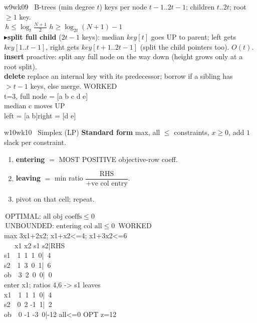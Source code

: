 \documentclass[9pt]{extarticle}
\newcommand{\key}[1]{\colorbox{hl}{\ensuremath{\,#1\,}}}     %
\newcommand{\R}{\textcolor{red!75!black}{$\blacktriangleright$}\;}  %
\newcommand{\ex}{\textcolor{black!55}{\scriptsize\textsf{WORKED}}\\[1pt]} %
\begin{document}
\begin{multicols}{3}
\begin{wk}{w9}{wk09 \ B-trees (min degree $t$)}
keys per node $t{-}1..2t{-}1$; children $t..2t$; root $\ge1$ key.\\[1pt]
\key{h\le\log_t\tfrac{N+1}{2}}\quad\key{h\ge\log_{2t}(N{+}1)-1}\\[2pt]
\R \textbf{split full child} ($2t{-}1$ keys): median $key[t]$ goes UP to parent; left gets $key[1..t{-}1]$, right gets $key[t{+}1..2t{-}1]$ (split the child pointers too). $O(t)$.\\[1pt]
\textbf{insert} proactive: split any full node on the way down (height grows only at a root split).\\
\textbf{delete} replace an internal key with its predecessor; borrow if a sibling has ${>}t{-}1$ keys, else merge.
\tcblower
\ex
\ttfamily
t=3, full node = [a b c d e]\\
median c moves UP\\
left = [a b]\quad right = [d e]
\end{wk}

\begin{wk}{w10}{wk10 \ Simplex (LP)}
\textbf{Standard form} max, all ${\le}$ constraints, $x\ge0$, add $1$ slack per constraint.
\begin{enumerate}
\item \textbf{entering} $=$ MOST POSITIVE objective-row coeff.
\item \textbf{leaving} $=$ min ratio $\dfrac{\text{RHS}}{\text{+ve col entry}}$.
\item pivot on that cell; repeat.
\end{enumerate}
\key{\text{OPTIMAL: all obj coeffs}\le0}\\
\key{\text{UNBOUNDED: entering col all}\le0}
\tcblower
\ex
\ttfamily
max 3x1+2x2; x1+x2<=4; x1+3x2<=6\\
\ \ \ x1 x2 s1 s2|RHS\\
s1\ \ 1\ 1\ 1\ 0|\ 4\\
s2\ \ 1\ 3\ 0\ 1|\ 6\\
ob\ \ 3\ 2\ 0\ 0|\ 0\\
enter x1; ratios 4,6 -> s1 leaves\\
x1\ \ 1\ 1\ 1\ 0|\ 4\\
s2\ \ 0\ 2 -1\ 1|\ 2\\
ob\ \ 0 -1 -3\ 0|-12  all<=0 OPT z=12
\end{wk}


\end{multicols}
\end{document}
